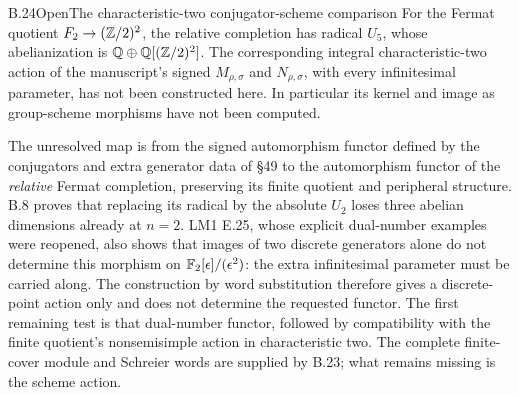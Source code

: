 \begin{statement}{B.24}{Open}{The characteristic-two conjugator-scheme comparison}
For the Fermat quotient $F_2\to(\mathbb Z/2)^2$, the relative completion
has radical $U_5$, whose abelianization is
$\mathbb Q\oplus\mathbb Q[(\mathbb Z/2)^2]$. The corresponding integral
characteristic-two action of the manuscript's signed
$M_{\rho,\sigma}$ and $N_{\rho,\sigma}$, with every
infinitesimal parameter, has not been constructed here.
In particular its kernel and image as group-scheme
morphisms have not been computed.
\end{statement}
The unresolved map is from the signed automorphism
functor defined by the conjugators and extra generator data
of \S49 to the automorphism functor of the \emph{relative}
Fermat completion, preserving its finite quotient and
peripheral structure. B.8 proves that replacing its radical
by the absolute $U_2$ loses three abelian dimensions already
at $n=2$. LM1 E.25, whose explicit dual-number examples
were reopened, also shows that images of two discrete
generators alone do not determine this morphism on
$\mathbb F_2[\epsilon]/(\epsilon^2)$: the extra infinitesimal
parameter must be carried along. The construction
by word substitution therefore gives a discrete-point
action only and does not determine the requested functor.
The first remaining test is that dual-number functor,
followed by compatibility with the finite quotient's
nonsemisimple action in characteristic two. The complete
finite-cover module and Schreier words are supplied by
B.23; what remains missing is the scheme action.






